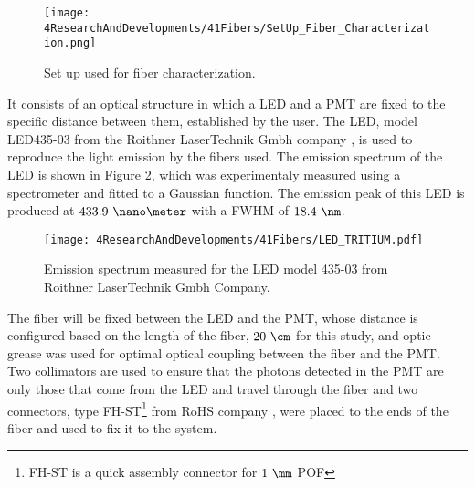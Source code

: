 \begin{figure}[h]
\centering
\texttt{[image: 4ResearchAndDevelopments/41Fibers/SetUp\_Fiber\_Characterization.png]}
\caption{Set up used for fiber characterization.\label{fig:SetUpFiberCharacterization}}
\end{figure}

It consists of an optical structure in which a LED and a PMT are fixed to the specific distance between them, established by the user. The LED, model LED435-03 from the Roithner LaserTechnik Gmbh company \cite{LEDRLT}, is used to reproduce the light emission by the fibers used. The emission spectrum of the LED is shown in Figure \ref{fig:LEDSpectrumTritium}, which was experimentaly measured using a spectrometer and fitted to a Gaussian function. The emission peak of this LED is produced at $433.9~\nano\meter$ with a FWHM of $18.4~\nm$. 

\begin{figure}[h]
\centering
\texttt{[image: 4ResearchAndDevelopments/41Fibers/LED\_TRITIUM.pdf]}
\caption{Emission spectrum measured for the LED model 435-03 from Roithner LaserTechnik Gmbh Company.\label{fig:LEDSpectrumTritium}}
\end{figure}

The fiber will be fixed between the LED and the PMT, whose distance is configured based on the length of the fiber, $20~\cm$ for this study, and optic grease \cite{OpticalGrease} was used for optimal optical coupling between the fiber and the PMT. Two collimators are used to ensure that the photons detected in the PMT are only those that come from the LED and travel through the fiber and two connectors, type FH-ST\footnote{FH-ST is a quick assembly connector for $1~\mm$ POF} from RoHS company \cite{}, were placed to the ends of the fiber and used to fix it to the system. 